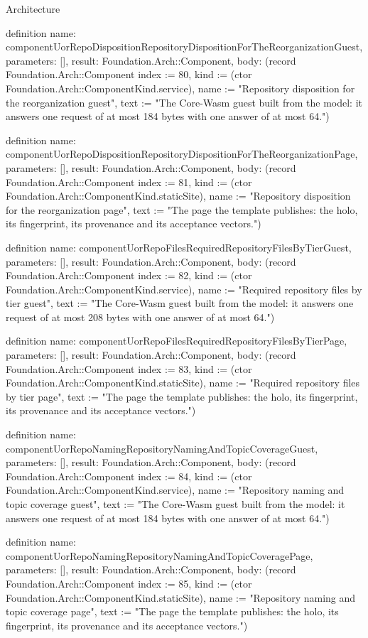 \begin{lexlean}{Architecture}
\begin{semanticmodule}
definition{
  name: componentUorRepoDispositionRepositoryDispositionForTheReorganizationGuest,
  parameters: [],
  result: Foundation.Arch::Component,
  body: (record Foundation.Arch::Component {index := 80, kind := (ctor Foundation.Arch::ComponentKind.service), name := "Repository disposition for the reorganization guest", text := "The Core-Wasm guest built from the model: it answers one request of at most 184 bytes with one answer of at most 64."})
}

definition{
  name: componentUorRepoDispositionRepositoryDispositionForTheReorganizationPage,
  parameters: [],
  result: Foundation.Arch::Component,
  body: (record Foundation.Arch::Component {index := 81, kind := (ctor Foundation.Arch::ComponentKind.staticSite), name := "Repository disposition for the reorganization page", text := "The page the template publishes: the holo, its fingerprint, its provenance and its acceptance vectors."})
}

definition{
  name: componentUorRepoFilesRequiredRepositoryFilesByTierGuest,
  parameters: [],
  result: Foundation.Arch::Component,
  body: (record Foundation.Arch::Component {index := 82, kind := (ctor Foundation.Arch::ComponentKind.service), name := "Required repository files by tier guest", text := "The Core-Wasm guest built from the model: it answers one request of at most 208 bytes with one answer of at most 64."})
}

definition{
  name: componentUorRepoFilesRequiredRepositoryFilesByTierPage,
  parameters: [],
  result: Foundation.Arch::Component,
  body: (record Foundation.Arch::Component {index := 83, kind := (ctor Foundation.Arch::ComponentKind.staticSite), name := "Required repository files by tier page", text := "The page the template publishes: the holo, its fingerprint, its provenance and its acceptance vectors."})
}

definition{
  name: componentUorRepoNamingRepositoryNamingAndTopicCoverageGuest,
  parameters: [],
  result: Foundation.Arch::Component,
  body: (record Foundation.Arch::Component {index := 84, kind := (ctor Foundation.Arch::ComponentKind.service), name := "Repository naming and topic coverage guest", text := "The Core-Wasm guest built from the model: it answers one request of at most 184 bytes with one answer of at most 64."})
}

definition{
  name: componentUorRepoNamingRepositoryNamingAndTopicCoveragePage,
  parameters: [],
  result: Foundation.Arch::Component,
  body: (record Foundation.Arch::Component {index := 85, kind := (ctor Foundation.Arch::ComponentKind.staticSite), name := "Repository naming and topic coverage page", text := "The page the template publishes: the holo, its fingerprint, its provenance and its acceptance vectors."})
}


\end{semanticmodule}
\end{lexlean}
